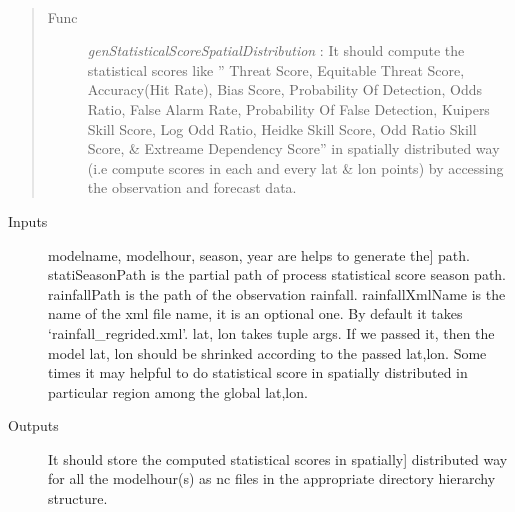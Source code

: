 \documentclass[letterpaper,10pt,english]{sphinxmanual}
\begin{document}
\begin{fulllineitems}
\label{diagnosis:compute_season_stati_score_spatial_distribution.genStatisticalScoreSpatialDistribution}~\begin{quote}\begin{description}
\item[{Func }] \leavevmode
\emph{genStatisticalScoreSpatialDistribution} : It should compute the
statistical scores like '' Threat Score, Equitable Threat Score,
Accuracy(Hit Rate), Bias Score, Probability Of Detection, Odds Ratio,
False Alarm Rate, Probability Of False Detection, Kuipers Skill Score,
Log Odd Ratio, Heidke Skill Score, Odd Ratio Skill Score, \&
Extreame Dependency Score'' in spatially distributed way (i.e compute
scores in each and every lat \& lon points) by accessing the
observation and forecast data.

\end{description}\end{quote}
\begin{description}
\item[{Inputs}] \leavevmode{[}modelname, modelhour, season, year are helps to generate the{]}
path. statiSeasonPath is the partial path of process statistical
score season path.
rainfallPath is the path of the observation rainfall.
rainfallXmlName is the name of the xml file name, it is an
optional one. By default it takes `rainfall\_regrided.xml'.
lat, lon takes tuple args. If we passed it, then the model lat,
lon should be shrinked according to the passed lat,lon.
Some times it may helpful to do statistical score in spatially
distributed in particular region among the global lat,lon.

\item[{Outputs}] \leavevmode{[}It should store the computed statistical scores in spatially{]}
distributed way for all the modelhour(s) as nc files in the
appropriate directory hierarchy structure.

\end{description}

\end{fulllineitems}
\end{document}
